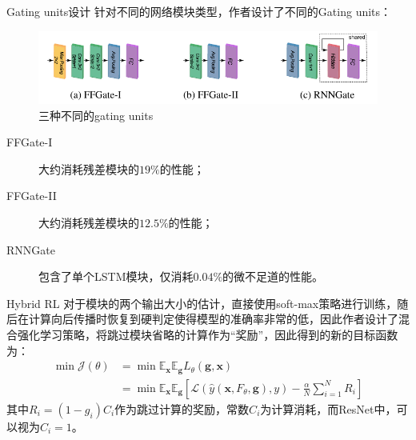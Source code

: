 \documentclass[UTF8, fontset=founder, aspectratio=43, 10pt, t]{ctexbeamer}
\begin{document}
\begin{frame}{Gating units设计}
	针对不同的网络模块类型，作者设计了不同的Gating units：
	\begin{figure}
		\centering
		\includegraphics[width=0.7\linewidth]{Images/gatingdesign1}
		\caption{三种不同的gating units}
		\label{fig:gatingdesign1}
	\end{figure}
	\begin{description}
		\item[FFGate-I] 大约消耗残差模块的$19\%$的性能；
		\item[FFGate-II] 大约消耗残差模块的$12.5\%$的性能；
		\item[RNNGate] 包含了单个LSTM模块，仅消耗$0.04\%$的微不足道的性能。
	\end{description}
	
\end{frame}

\begin{frame}{Hybrid RL}
	对于模块的两个输出大小的估计，直接使用soft-max策略进行训练，随后在计算向后传播时恢复到硬判定使得模型的准确率非常的低，因此作者设计了混合强化学习策略，将跳过模块省略的计算作为“奖励”，因此得到的新的目标函数为：
	\begin{equation}
	\begin{aligned} \min \mathcal{J}(\theta) &=\min \mathbb{E}_{\mathbf{x}} \mathbb{E}_{\mathbf{g}} L_{\theta}(\mathbf{g}, \mathbf{x}) \\ &=\min \mathbb{E}_{\mathbf{x}} \mathbb{E}_{\mathbf{g}}\left[\mathcal{L}\left(\hat{y}\left(\mathbf{x}, F_{\theta}, \mathbf{g}\right), y\right)-\frac{\alpha}{N} \sum_{i=1}^{N} R_{i}\right] \end{aligned}
	\end{equation}
	其中$R_{i}=\left(1-g_{i}\right) C_{i}$作为跳过计算的奖励，常数$C_{i}$为计算消耗，而ResNet中，可以视为$C_{i}=1$。
	
\end{frame}
\end{document}
